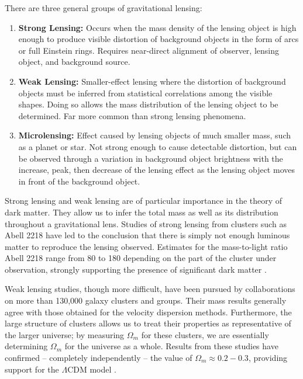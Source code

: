 \documentclass{report}
\begin{document}
There are three general groups of gravitational lensing:

\begin{enumerate}
\item \textbf{Strong Lensing:} Occurs when the mass density of the lensing object is high enough to produce visible distortion of background objects in the form of arcs or full Einstein rings. Requires near-direct alignment of observer, lensing object, and background source.
\item \textbf{Weak Lensing:} Smaller-effect lensing where the distortion of background objects must be inferred from statistical correlations among the visible shapes. Doing so allows the mass distribution of the lensing object to be determined. Far more common than strong lensing phenomena.
\item \textbf{Microlensing:} Effect caused by lensing objects of much smaller mass, such as a planet or star. Not strong enough to cause detectable distortion, but can be observed through a variation in background object brightness with the increase, peak, then decrease of the lensing effect as the lensing object moves in front of the background object.
\end{enumerate}

Strong lensing and weak lensing are of particular importance in the theory of dark matter. They allow us to infer the total mass as well as its distribution throughout a gravitational lens. Studies of strong lensing from clusters such as Abell 2218 have led to the conclusion that there is simply not enough luminous matter to reproduce the lensing observed. Estimates for the mass-to-light ratio Abell 2218 range from 80 to 180 depending on the part of the cluster under observation, strongly supporting the presence of significant dark matter \cite{Kneib1995,Kneib1996}.

Weak lensing studies, though more difficult, have been pursued by collaborations \cite{Sheldon2009} on more than 130,000 galaxy clusters and groups. Their mass results generally agree with those obtained for the velocity dispersion methods. Furthermore, the large structure of clusters allows us to treat their properties as representative of the larger universe; by measuring $\Omega_{m}$ for these clusters, we are essentially determining $\Omega_{m}$ for the universe as a whole. Results from these studies have confirmed -- completely independently -- the value of $\Omega_{m} \approx 0.2 - 0.3$, providing support for the $\Lambda$CDM model \cite{Sheldon2009}.
\end{document}
